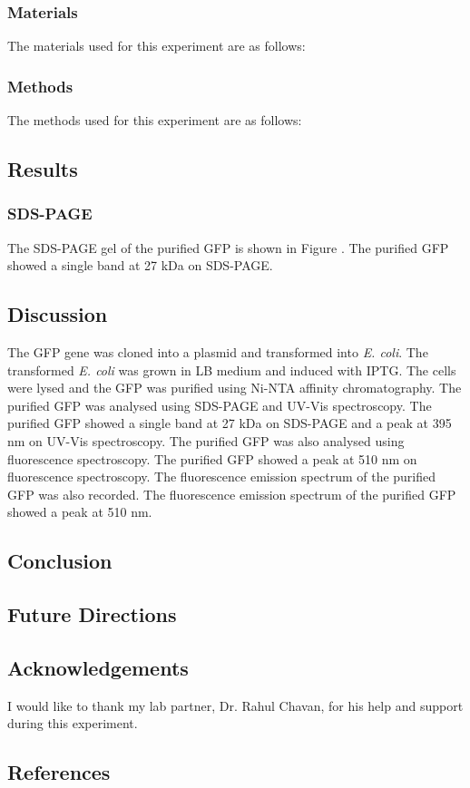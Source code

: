 \documentclass{article}
\begin{document}
\begin{multicols}{2}
\subsubsection*{Materials}
The materials used for this experiment are as follows:


\subsubsection*{Methods}
The methods used for this experiment are as follows:



\subsection*{Results}
\subsubsection*{SDS-PAGE}
The SDS-PAGE gel of the purified GFP is shown in Figure . The purified GFP showed a single band at 27 kDa on SDS-PAGE.


\subsection*{Discussion}
The GFP gene was cloned into a plasmid and transformed into \textit{E. coli}. 
The transformed \textit{E. coli} was grown in LB medium and induced with IPTG. 
The cells were lysed and the GFP was purified using Ni-NTA affinity chromatography. 
The purified GFP was analysed using SDS-PAGE and UV-Vis spectroscopy. 
The purified GFP showed a single band at 27 kDa on SDS-PAGE and a peak at 395 nm on UV-Vis spectroscopy. 
The purified GFP was also analysed using fluorescence spectroscopy. 
The purified GFP showed a peak at 510 nm on fluorescence spectroscopy. 
The fluorescence emission spectrum of the purified GFP was also recorded. 
The fluorescence emission spectrum of the purified GFP showed a peak at 510 nm.

\subsection*{Conclusion}


\subsection*{Future Directions}

\subsection*{Acknowledgements}
I would like to thank my lab partner, Dr. Rahul Chavan, for his help and support during this experiment.




\subsection*{References}



\end{multicols}
\end{document}
